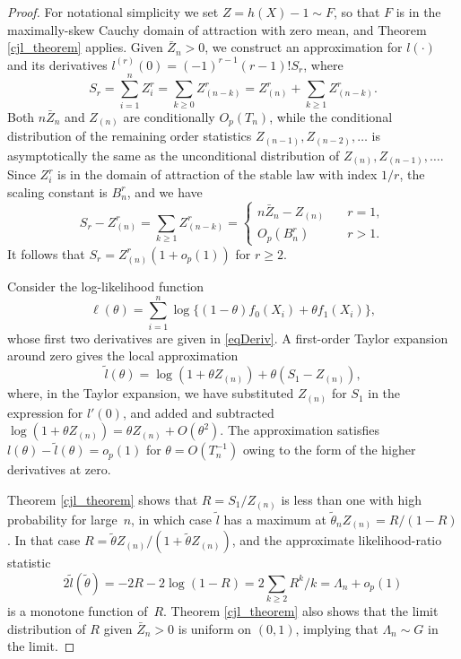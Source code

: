 \documentclass[11pt]{article}
\theoremstyle{definition}
\begin{document}
\begin{proof}
	For notational simplicity  we set $Z = h(X) - 1 \sim F$, so that $F$ is in the maximally-skew Cauchy domain of attraction with zero mean, and Theorem \ref{cjl_theorem} applies. Given $\bar Z_n > 0$, we construct an approximation for $l(\cdot)$ and its derivatives $l^{(r)}(0) = (-1)^{r-1} (r-1)! S_r$, where
	\[
	S_r = \sum_{i=1}^n Z_i^r =  \sum_{k\ge0} Z_{(n-k)}^r = Z_{(n)}^r + \sum_{k\ge1} Z_{(n-k)}^r.
	\]
	Both $n\bar Z_n$ and $Z_{(n)}$ are conditionally $O_p(T_n)$, while the conditional distribution of the remaining order statistics $Z_{(n-1)}, Z_{(n-2)},\ldots$ is asymptotically the same as the unconditional distribution of $Z_{(n)}, Z_{(n-1)},\ldots$.
	Since $Z_i^r$ is in the domain of attraction of the stable law with index $1/r$, the scaling constant is $B_n^r$, and we have
	\[
	S_r - Z_{(n)}^r =  \sum_{k\ge1} Z_{(n-k)}^r = \left\{
	\begin{array}{ll} n\bar Z_n - Z_{(n)} &\quad r=1, \\
	O_p(B_n^r) & \quad r > 1. \end{array} \right.
	\]
	It follows that $S_r = Z_{(n)}^r(1 + o_p(1))$ for $r \ge 2$. 
	
	Consider the log-likelihood function 
	\[
	\ell(\theta) = \sum_{i=1}^n \log\{(1-\theta)f_0(X_i) + \theta f_1(X_i)\},
	\]
	whose first two derivatives are given in \eqref{eqDeriv}. A first-order Taylor expansion around zero gives the local approximation
	\begin{equation}\label{eqLLL}
	\tilde l(\theta) = \log(1 + \theta Z_{(n)}) + \theta (S_1 - Z_{(n)}),
	\end{equation}
	where, in the Taylor expansion, we have substituted $Z_{(n)}$ for $S_1$ in the expression for $l'(0)$, and added and subtracted $\log(1+\theta Z_{(n)})=\theta Z_{(n)}+O(\theta^2)$. The approximation satisfies $l(\theta) - \tilde l(\theta) = o_p(1)$ for $\theta = O(T_n^{-1})$ owing to the form of the higher derivatives at zero. 
	
	Theorem \ref{cjl_theorem} shows that $R = S_1/Z_{(n)}$ is less than one with high probability for large~$n$, in which case $\tilde l$ has a maximum at $\tilde\theta_n Z_{(n)} = R/(1-R)$.  In that case $R = \tilde\theta Z_{(n)}/(1 + \tilde\theta Z_{(n)})$, and the approximate likelihood-ratio statistic
	\begin{equation}\label{llr_limit}
	2\tilde l(\tilde\theta) = -2R - 2\log(1 - R) = 2\sum_{k \ge 2} R^k/k = \Lambda_n + o_p(1)
	\end{equation}
	is a monotone function of~$R$.
	Theorem \ref{cjl_theorem} also shows that the limit distribution of $R$ given $\bar Z_n > 0$ is uniform on $(0, 1)$, implying that $\Lambda_n \sim G$ in the limit.
\end{proof}
\end{document}
